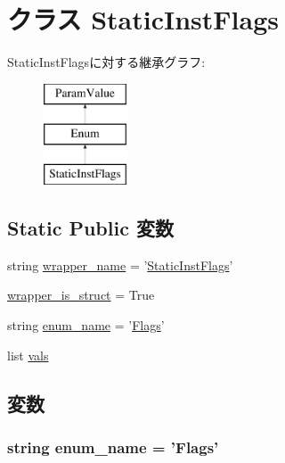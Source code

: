 \hypertarget{classStaticInstFlags_1_1StaticInstFlags}{
\section{クラス StaticInstFlags}
\label{classStaticInstFlags_1_1StaticInstFlags}
}
StaticInstFlagsに対する継承グラフ:\begin{figure}[H]
\begin{center}
\leavevmode
\includegraphics[height=3cm]{classStaticInstFlags_1_1StaticInstFlags}
\end{center}
\end{figure}
\subsection*{Static Public 変数}
\begin{DoxyCompactItemize}
\item 
string \hyperlink{classStaticInstFlags_1_1StaticInstFlags_a8d8e670fd263dbfded71859e88b6ac8b}{wrapper\_\-name} = '\hyperlink{classStaticInstFlags_1_1StaticInstFlags}{StaticInstFlags}'
\item 
\hyperlink{classStaticInstFlags_1_1StaticInstFlags_a774c4f5a238e6bd6cc19b2ad18ec0f4f}{wrapper\_\-is\_\-struct} = True
\item 
string \hyperlink{classStaticInstFlags_1_1StaticInstFlags_a8a0a62d3d14654ce0a39c073e37b3448}{enum\_\-name} = '\hyperlink{classFlags}{Flags}'
\item 
list \hyperlink{classStaticInstFlags_1_1StaticInstFlags_ac8dfdb1d5e96e93836fb573bc3cd2110}{vals}
\end{DoxyCompactItemize}


\subsection{変数}
\hypertarget{classStaticInstFlags_1_1StaticInstFlags_a8a0a62d3d14654ce0a39c073e37b3448}{
\subsubsection[{enum\_\-name}]{\setlength{\rightskip}{0pt plus 5cm}string {\bf enum\_\-name} = '{\bf Flags}'}}
\label{classStaticInstFlags_1_1StaticInstFlags_a8a0a62d3d14654ce0a39c073e37b3448}


